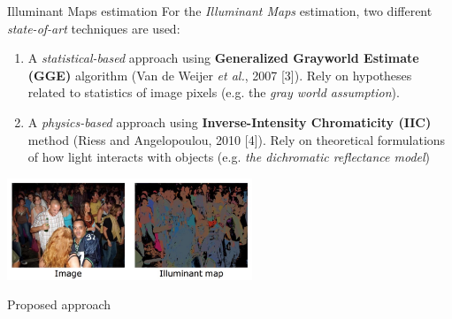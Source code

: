 \begin{tframe}{Illuminant Maps estimation}
\vspace{0.2cm}
For the \emph{Illuminant Maps} estimation, two different \emph{state-of-art} techniques are used: 
\vspace{0.3cm}
\begin{small}
\begin{enumerate}
\item A \emph{statistical-based} approach using \textbf{Generalized Grayworld Estimate (GGE)} algorithm {\tiny (Van de Weijer \emph{et al.}, 2007 [3])}. Rely on hypotheses related to statistics of image pixels (e.g.  the \emph{gray world assumption}).
\vspace{0.2cm}
\item A \emph{physics-based} approach using \textbf{Inverse-Intensity Chromaticity (IIC)} method {\tiny (Riess and Angelopoulou, 2010 [4])}. Rely on theoretical formulations of how light interacts with objects (e.g. \emph{the dichromatic reflectance model})
\end{enumerate}
\end{small}

\begin{center}
\includegraphics[width=0.55\textwidth]{images/riess.jpg}
\end{center}

\end{tframe}

\begin{tframe}{Proposed approach}
\end{tframe}



